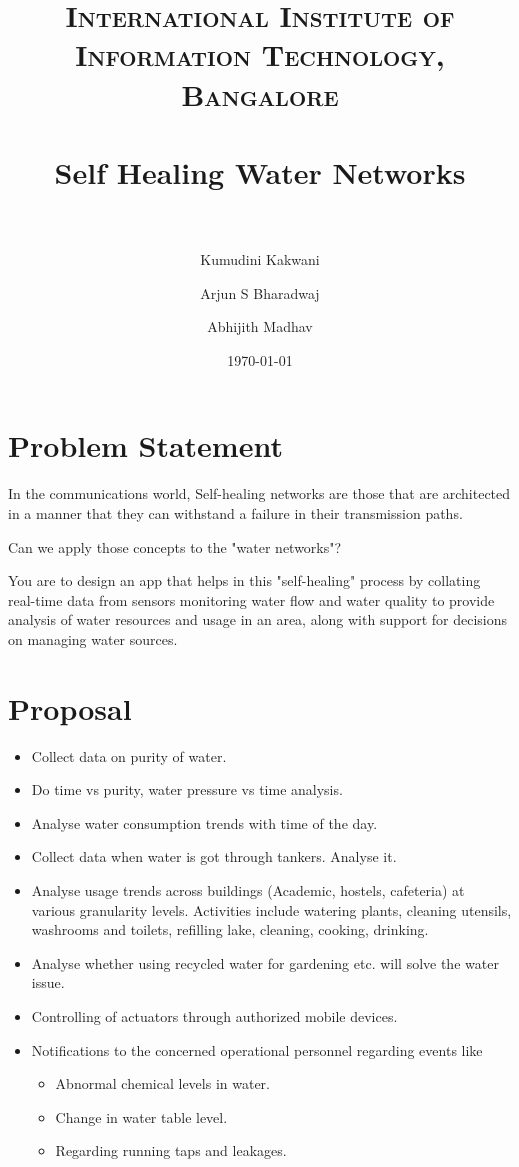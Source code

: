 \documentclass[paper=a4, fontsize=11pt]{scrartcl} %
\title{	
\normalfont \normalsize 
\textsc{International Institute of Information Technology, Bangalore} \\ [25pt] %
\horrule{0.5pt} \\[0.4cm] %
\huge Self Healing Water Networks \\ %
\horrule{2pt} \\[0.5cm] %
}
\author{Kumudini Kakwani 
\and Arjun S Bharadwaj
\and Abhijith Madhav}
\date{\normalsize\today} %
\numberwithin{equation}{section} %
\numberwithin{figure}{section} %
\numberwithin{table}{section} %
\begin{document}
\maketitle %


\section{Problem Statement}



In the communications world, Self-healing networks are those that are architected in a manner that they can withstand a failure in their transmission paths.
 
Can we apply those concepts to the "water networks"?
 
You are to design an app that helps in this "self-healing" process by collating real-time data from sensors monitoring water flow and water quality to provide analysis of water resources and usage in an area, along with support for decisions on managing water sources.



\section{Proposal}
\begin{itemize}
\item Collect data on purity of water. 
\item Do time vs purity, water pressure vs time analysis.
\item Analyse water consumption trends with time of the day.
\item Collect data when water is got through tankers. Analyse it.
\item Analyse usage trends across buildings (Academic, hostels, cafeteria) at various granularity levels. Activities include watering plants, cleaning utensils, washrooms and toilets, refilling lake, cleaning, cooking, drinking.
\item Analyse whether using recycled water for gardening etc. will solve the water issue.
\item Controlling of actuators through authorized mobile devices.
\item Notifications to the concerned operational personnel regarding events like 
\begin{itemize}
\item Abnormal chemical levels in water.
\item Change in water table level.
\item Regarding running taps and leakages.
\end{itemize}
\end{itemize}
\end{document}
